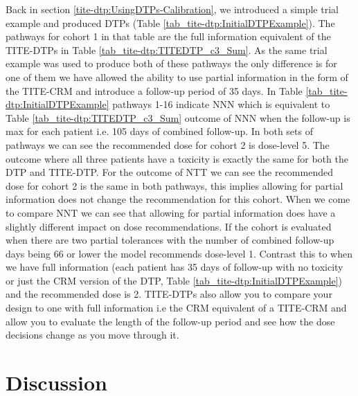 Back in section \ref{tite-dtp:UsingDTPs-Calibration}, we introduced a simple trial example and produced DTPs (Table \ref{tab_tite-dtp:InitialDTPExample}). The pathways for cohort 1 in that table are the full information equivalent of the TITE-DTPs in Table \ref{tab_tite-dtp:TITEDTP_c3_Sum}. As the same trial example was used to produce both of these pathways the only difference is for one of them we have allowed the ability to use partial information in the form of the TITE-CRM and introduce a follow-up period of 35 days. In Table \ref{tab_tite-dtp:InitialDTPExample} pathways 1-16 indicate NNN which is equivalent to Table \ref{tab_tite-dtp:TITEDTP_c3_Sum} outcome of NNN when the follow-up is max for each patient i.e. 105 days of combined follow-up. In both sets of pathways we can see the recommended dose for cohort 2 is dose-level 5. The outcome where all three patients have a toxicity is exactly the same for both the DTP and TITE-DTP. For the outcome of NTT we can see the recommended dose for cohort 2 is the same in both pathways, this implies allowing for partial information does not change the recommendation for this cohort. When we come to compare NNT we can see that allowing for partial information does have a slightly different impact on dose recommendations. If the cohort is evaluated when there are two partial tolerances with the number of combined follow-up days being 66 or lower the model recommends dose-level 1. Contrast this to when we have full information (each patient has 35 days of follow-up with no toxicity or just the CRM version of the DTP, Table \ref{tab_tite-dtp:InitialDTPExample}) and the recommended dose is 2. TITE-DTPs also allow you to compare your design to one with full information i.e the CRM equivalent of a TITE-CRM and allow you to evaluate the length of the follow-up period and see how the dose decisions change as you move through it. 


\section{Discussion}
\label{tite-dtp:Discussion}

